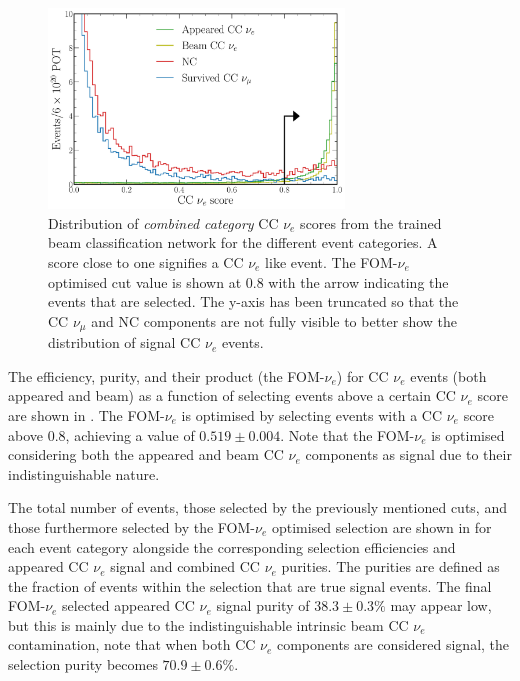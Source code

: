 \begin{figure} %
    \includegraphics[width=0.7\textwidth]{diagrams/7-results/final_beam_nuel_outputs.pdf}
    \caption[Distribution of CC $\nu_{e}$ scores from the trained beam classification network]
    {Distribution of \emph{combined category} CC $\nu_{e}$ scores from the trained beam
        classification network for the different event categories. A score close to one signifies
        a CC $\nu_{e}$ like event. The FOM-$\nu_e$ optimised cut value is shown at $0.8$ with the
        arrow indicating the events that are selected. The y-axis has been truncated so that the
        CC $\nu_{\mu}$ and NC components are not fully visible to better show the distribution of
        signal CC $\nu_{e}$ events.}
    \label{fig:final_beam_nuel_outputs}
\end{figure}

The efficiency, purity, and their product (the FOM-$\nu_e$) for CC $\nu_{e}$ events (both appeared
and beam) as a function of selecting events above a certain CC $\nu_{e}$ score are shown in
. The FOM-$\nu_e$ is optimised by selecting events with a CC
$\nu_{e}$ score above $0.8$, achieving a value of $0.519\pm0.004$. Note that the FOM-$\nu_e$ is
optimised considering both the appeared and beam CC $\nu_{e}$ components as signal due to their
indistinguishable nature.

The total number of events, those selected by the previously mentioned cuts, and those furthermore
selected by the FOM-$\nu_e$ optimised selection are shown in  for
each event category alongside the corresponding selection efficiencies and appeared CC $\nu_{e}$
signal and combined CC $\nu_{e}$ purities. The purities are defined as the fraction of events
within the selection that are true signal events. The final FOM-$\nu_e$ selected appeared CC
$\nu_{e}$ signal purity of $38.3\pm0.3\%$ may appear low, but this is mainly due to the
indistinguishable intrinsic beam CC $\nu_{e}$ contamination, note that when both CC $\nu_{e}$
components are considered signal, the selection purity becomes $70.9\pm0.6\%$.

